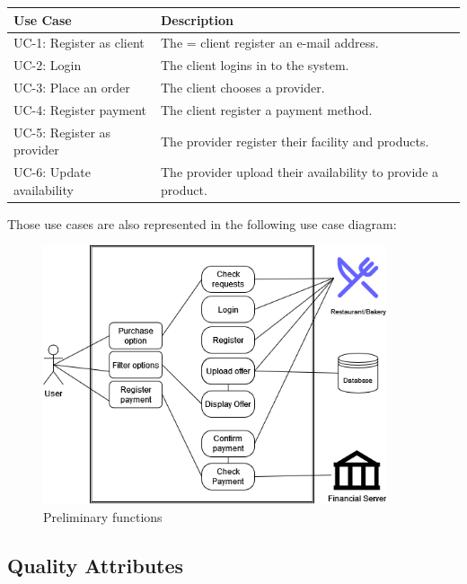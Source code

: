 \begin{table}[H]
    \begin{tabularx}{\textwidth}{lX}
    \toprule
    Use Case & Description  \\
    \midrule
    UC-1: Register as \gls{client} & The = \gls{client} register an e-mail address.\\
    UC-2: Login & The \gls{client} logins in to the system. \\
    UC-3: Place an order & The \gls{client} chooses a \gls{provider}. \\
    UC-4: Register payment & The \gls{client} register a payment method. \\
    UC-5: Register as \gls{provider} & The \gls{provider} register their facility and products. \\
    UC-6: Update availability & The \gls{provider} upload their availability to provide a product. \\
    \bottomrule
    \end{tabularx}
\end{table}

Those use cases are also represented in the following use case diagram:

\begin{figure}[H]
    \centering
    \includegraphics[width=0.9\textwidth]{assets/preliminary_use_case.png}
    \caption{Preliminary functions}
    \label{fig:preliminary_use_case}
\end{figure}


\subsection{Quality Attributes}

